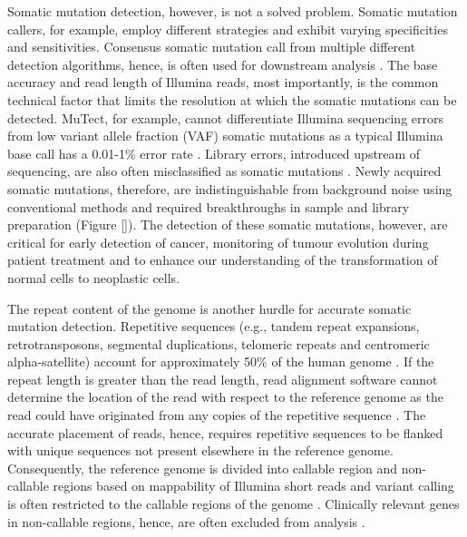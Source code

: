 Somatic mutation detection, however, is not a solved problem. Somatic mutation callers, for example, employ different strategies and exhibit varying specificities and sensitivities. Consensus somatic mutation call from multiple different detection algorithms, hence, is often used for downstream analysis \cite{Bailey2020-ou}. The base accuracy and read length of Illumina reads, most importantly, is the common technical factor that limits the resolution at which the somatic mutations can be detected. MuTect, for example, cannot differentiate Illumina sequencing errors from low variant allele fraction (VAF) somatic mutations as a typical Illumina base call has a 0.01-1\% error rate \cite{Cibulskis2013-gw}. Library errors, introduced upstream of sequencing, are also often misclassified as somatic mutations \cite{Costello2013-cz, Chen2017-ba, Abascal2021-pk}. Newly acquired somatic mutations, therefore, are indistinguishable from background noise using conventional methods and required breakthroughs in sample and library preparation (Figure \ref{}). The detection of these somatic mutations, however, are critical for early detection of cancer, monitoring of tumour evolution during patient treatment and to enhance our understanding of the transformation of normal cells to neoplastic cells. 

The repeat content of the genome is another hurdle for accurate somatic mutation detection. Repetitive sequences (e.g., tandem repeat expansions, retrotransposons, segmental duplications, telomeric repeats and centromeric alpha-satellite) account for approximately 50\% of the human genome \cite{Lander2001-du}. If the repeat length is greater than the read length, read alignment software cannot determine the location of the read with respect to the reference genome as the read could have originated from any copies of the repetitive sequence \cite{Li2008-dt}. The accurate placement of reads, hence, requires repetitive sequences to be flanked with unique sequences not present elsewhere in the reference genome. Consequently, the reference genome is divided into callable region and non-callable regions based on mappability of Illumina short reads and variant calling is often restricted to the callable regions of the genome \cite{1000_Genomes_Project_Consortium2012-rj}. Clinically relevant genes in non-callable regions, hence, are often excluded from analysis \cite{Wagner2022-ph}.

